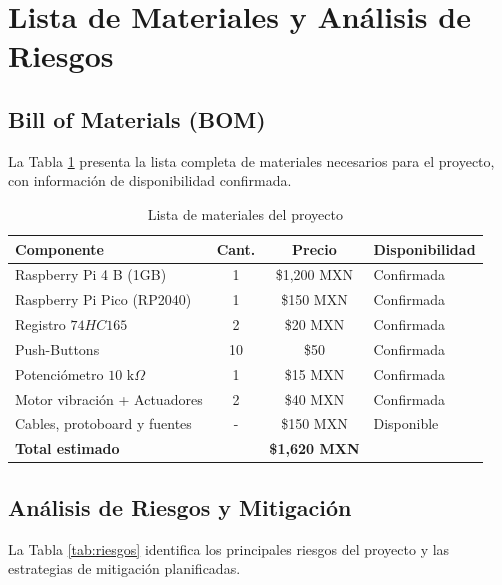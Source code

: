\documentclass[conference]{IEEEtran}
\begin{document}
\section{Lista de Materiales y Análisis de Riesgos}

\subsection{Bill of Materials (BOM)}

La Tabla \ref{tab:bom} presenta la lista completa de materiales necesarios para el proyecto, con información de disponibilidad confirmada.

\begin{table}[H]
	\centering
	\caption{Lista de materiales del proyecto}
	\label{tab:bom}
	\small
	\begin{tabular}{|p{3cm}|c|c|p{2.3cm}|}
		\hline
		\textbf{Componente} & \textbf{Cant.} & \textbf{Precio} & \textbf{Disponibilidad} \\
		\hline
		Raspberry Pi 4 B (1GB) & 1 & \$1,200 MXN & Confirmada \\
		\hline
		Raspberry Pi Pico (RP2040) & 1 & \$150 MXN & Confirmada \\
		\hline
		Registro $74HC165$ & 2 & \$20 MXN & Confirmada \\
		\hline
		Push-Buttons  & 10 & \$50 & Confirmada \\
		\hline
		Potenciómetro $10\text{ k}\Omega$ & 1 & \$15 MXN & Confirmada \\
		\hline
		Motor vibración + Actuadores & 2 & \$40 MXN & Confirmada \\
		\hline
		Cables, protoboard y fuentes & - & \$150 MXN & Disponible \\
		\hline
		\textbf{Total estimado} & & \textbf{\$1,620 MXN} & \\
		\hline
	\end{tabular}
\end{table}

\subsection{Análisis de Riesgos y Mitigación}

La Tabla \ref{tab:riesgos} identifica los principales riesgos del proyecto y las estrategias de mitigación planificadas.
\end{document}
